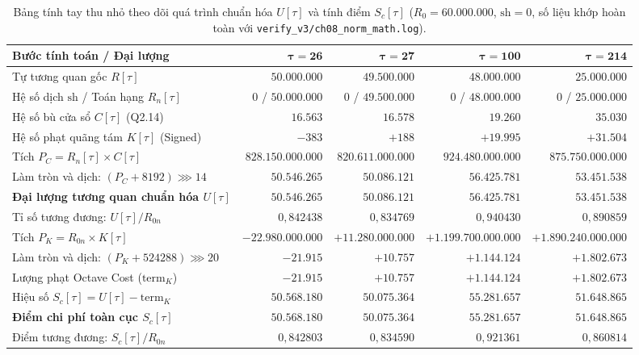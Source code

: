 \begin{table}[htbp]
\centering
\footnotesize
\caption{Bảng tính tay thu nhỏ theo dõi quá trình chuẩn hóa $U[\tau]$ và tính điểm $S_c[\tau]$ ($R_0 = 60.000.000$, $\text{sh} = 0$, số liệu khớp hoàn toàn với \texttt{verify\_v3/ch08\_norm\_math.log}).}
\label{tab:ch08_trace}
\begin{tabularx}{\textwidth}{>{\raggedright\arraybackslash}X rrrr}
\toprule
\textbf{Bước tính toán / Đại lượng} & $\mathbf{\tau = 26}$ & $\mathbf{\tau = 27}$ & $\mathbf{\tau = 100}$ & $\mathbf{\tau = 214}$ \\
\midrule
Tự tương quan gốc $R[\tau]$ & $50.000.000$ & $49.500.000$ & $48.000.000$ & $25.000.000$ \\
Hệ số dịch $\text{sh}$ / Toán hạng $R_n[\tau]$ & $0$ / $50.000.000$ & $0$ / $49.500.000$ & $0$ / $48.000.000$ & $0$ / $25.000.000$ \\
Hệ số bù cửa sổ $C[\tau]$ (Q2.14) & $16.563$ & $16.578$ & $19.260$ & $35.030$ \\
Hệ số phạt quãng tám $K[\tau]$ (Signed) & $-383$ & $+188$ & $+19.995$ & $+31.504$ \\
\addlinespace[3pt]
Tích $P_C = R_n[\tau] \times C[\tau]$ & $828.150.000.000$ & $820.611.000.000$ & $924.480.000.000$ & $875.750.000.000$ \\
Làm tròn và dịch: $(P_C + 8192) \ggg 14$ & $\mathbf{50.546.265}$ & $\mathbf{50.086.121}$ & $\mathbf{56.425.781}$ & $\mathbf{53.451.538}$ \\
\textbf{Đại lượng tương quan chuẩn hóa $U[\tau]$} & $\mathbf{50.546.265}$ & $\mathbf{50.086.121}$ & $\mathbf{56.425.781}$ & $\mathbf{53.451.538}$ \\
Tỉ số tương đương: $U[\tau] / R_{0n}$ & $0{,}842438$ & $0{,}834769$ & $0{,}940430$ & $0{,}890859$ \\
\addlinespace[3pt]
Tích $P_K = R_{0n} \times K[\tau]$ & $-22.980.000.000$ & $+11.280.000.000$ & $+1.199.700.000.000$ & $+1.890.240.000.000$ \\
Làm tròn và dịch: $(P_K + 524288) \ggg 20$ & $\mathbf{-21.915}$ & $\mathbf{+10.757}$ & $\mathbf{+1.144.124}$ & $\mathbf{+1.802.673}$ \\
Lượng phạt Octave Cost ($\text{term}_K$) & $-21.915$ & $+10.757$ & $+1.144.124$ & $+1.802.673$ \\
\addlinespace[3pt]
Hiệu số $S_c[\tau] = U[\tau] - \text{term}_K$ & $\mathbf{50.568.180}$ & $\mathbf{50.075.364}$ & $\mathbf{55.281.657}$ & $\mathbf{51.648.865}$ \\
\textbf{Điểm chi phí toàn cục $S_c[\tau]$} & $\mathbf{50.568.180}$ & $\mathbf{50.075.364}$ & $\mathbf{55.281.657}$ & $\mathbf{51.648.865}$ \\
Điểm tương đương: $S_c[\tau] / R_{0n}$ & $0{,}842803$ & $0{,}834590$ & $0{,}921361$ & $0{,}860814$ \\
\bottomrule
\end{tabularx}
\end{table}


